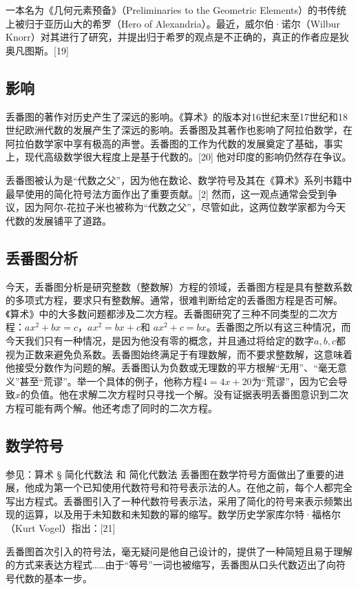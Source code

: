 一本名为《几何元素预备》（Preliminaries to the Geometric Elements）的书传统上被归于亚历山大的希罗（Hero of Alexandria）。最近，威尔伯·诺尔（Wilbur Knorr）对其进行了研究，并提出归于希罗的观点是不正确的，真正的作者应是狄奥凡图斯。[19]
\subsection{影响}  
丢番图的著作对历史产生了深远的影响。《算术》的版本对16世纪末至17世纪和18世纪欧洲代数的发展产生了深远的影响。丢番图及其著作也影响了阿拉伯数学，在阿拉伯数学家中享有极高的声誉。丢番图的工作为代数的发展奠定了基础，事实上，现代高级数学很大程度上是基于代数的。[20] 他对印度的影响仍然存在争议。

丢番图被认为是“代数之父”，因为他在数论、数学符号及其在《算术》系列书籍中最早使用的简化符号法方面作出了重要贡献。[2] 然而，这一观点通常会受到争议，因为阿尔-花拉子米也被称为“代数之父”，尽管如此，这两位数学家都为今天代数的发展铺平了道路。
\subsection{丢番图分析}    
今天，丢番图分析是研究整数（整数解）方程的领域，丢番图方程是具有整数系数的多项式方程，要求只有整数解。通常，很难判断给定的丢番图方程是否可解。《算术》中的大多数问题都涉及二次方程。丢番图研究了三种不同类型的二次方程：\(ax^2+bx=c\)，\(ax^2=bx+c\)和 \(ax^2+c=bx\)。丢番图之所以有这三种情况，而今天我们只有一种情况，是因为他没有零的概念，并且通过将给定的数字\(a,b,c\)都视为正数来避免负系数。丢番图始终满足于有理数解，而不要求整数解，这意味着他接受分数作为问题的解。丢番图认为负数或无理数的平方根解“无用”、“毫无意义”甚至“荒谬”。举一个具体的例子，他称方程\(4=4x+20\)为“荒谬”，因为它会导致\(x\)的负值。他在求解二次方程时只寻找一个解。没有证据表明丢番图意识到二次方程可能有两个解。他还考虑了同时的二次方程。
\subsection{数学符号}  
参见：算术 § 简化代数法 和 简化代数法  
丢番图在数学符号方面做出了重要的进展，他成为第一个已知使用代数符号和符号表示法的人。在他之前，每个人都完全写出方程式。丢番图引入了一种代数符号表示法，采用了简化的符号来表示频繁出现的运算，以及用于未知数和未知数的幂的缩写。数学历史学家库尔特·福格尔（Kurt Vogel）指出：[21]

丢番图首次引入的符号法，毫无疑问是他自己设计的，提供了一种简短且易于理解的方式来表达方程式……由于“等号”一词也被缩写，丢番图从口头代数迈出了向符号代数的基本一步。

